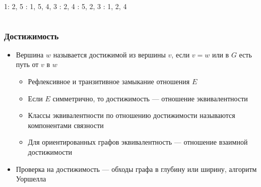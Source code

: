 \documentclass{../../slides-style}
\begin{document}
\begin{frame}
\begin{columns}
\begin{column}{0.35\textwidth}
\begin{center}
                \end{center}
                1: 2, 5 : 1, 5, 4, 3 : 2, 4 : 5, 2, 3 : 1, 2, 4
            \end{column}
        \end{columns}
    \end{frame}

    \begin{frame}
        \frametitle{Достижимость}
        \begin{itemize}
            \item Вершина $w$ называется достижимой из вершины $v$, если $v = w$ или в $G$ есть путь от $v$ в $w$
            \begin{itemize}
                \item Рефлексивное и транзитивное замыкание отношения $E$
                \item Если $E$ симметрично, то достижимость --- отношение эквивалентности
                \item Классы эквивалентности по отношению достижимости называются компонентами связности
                \item Для ориентированных графов эквивалентность --- отношение взаимной достижимости
            \end{itemize}
            \item Проверка на достижимость --- обходы графа в глубину или ширину, алгоритм Уоршелла
        \end{itemize}
    \end{frame}
\end{document}
